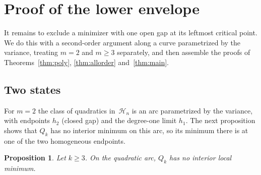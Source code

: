 \documentclass[11pt]{article}
\newtheorem{proposition}[theorem]{Proposition}
\theoremstyle{remark}
\newcommand{\HH}{\mathcal H}
\begin{document}
\section{Proof of the lower envelope}\label{sec:proof}

It remains to exclude a minimizer with one open gap at its leftmost
critical point. We do this with a second-order argument along a curve
parametrized by the variance, treating $m=2$ and $m\ge3$ separately, and
then assemble the proofs of Theorems~\ref{thm:poly}, \ref{thm:allorder}
and~\ref{thm:main}.

\subsection{Two states}
For $m=2$ the class of quadratics in~$\HH_n$ is an arc parametrized by the
variance, with endpoints $h_2$ (closed gap) and the degree-one limit $h_1$.
The next proposition shows that $Q_k$ has no interior minimum on this arc,
so its minimum there is at one of the two homogeneous endpoints.

\begin{proposition}\label{prop:quadratic}
Let $k\ge3$. On the quadratic arc, $Q_k$ has no interior local minimum.
\end{proposition}
\end{document}
